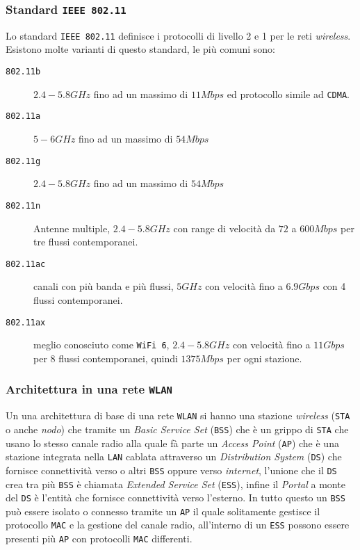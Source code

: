         \subsubsection{Standard \texttt{IEEE 802.11}}
            Lo standard \texttt{IEEE 802.11} definisce i protocolli di livello 2 e 1 per le reti \textit{wireless}. Esistono molte varianti di questo standard, le più comuni sono:
            \begin{description}
                \item[\texttt{802.11b}] $2.4-5.8GHz$ fino ad un massimo di $11Mbps$ ed protocollo simile ad \texttt{CDMA}.
                \item[\texttt{802.11a}] $5-6GHz$ fino ad un massimo di $54Mbps$
                \item[\texttt{802.11g}] $2.4-5.8GHz$ fino ad un massimo di $54Mbps$
                \item[\texttt{802.11n}] Antenne multiple, $2.4-5.8GHz$ con range di velocità da $72$ a $600Mbps$ per tre flussi contemporanei.
                \item[\texttt{802.11ac}] canali con più banda e più flussi, $5GHz$ con velocità fino a $6.9Gbps$ con 4 flussi contemporanei.
                \item[\texttt{802.11ax}] meglio conosciuto come \texttt{WiFi 6}, $2.4-5.8GHz$ con velocità fino a $11Gbps$ per 8 flussi contemporanei, quindi $1375Mbps$ per ogni stazione.
            \end{description}
        \subsubsection{Architettura in una rete \texttt{WLAN}}
            Un una architettura di base di una rete \texttt{WLAN} si hanno una stazione \textit{wireless} (\texttt{STA} o anche \textit{nodo}) che tramite un \textit{Basic Service Set} (\texttt{BSS}) che è un grippo di \texttt{STA} che usano lo stesso canale radio alla quale fà parte un \textit{Access Point} (\texttt{AP}) che è una stazione integrata nella \texttt{LAN} cablata attraverso un \textit{Distribution System} (\texttt{DS}) che fornisce connettività verso o altri \texttt{BSS} oppure verso \textit{internet}, l'unione che il \texttt{DS} crea tra più \texttt{BSS} è chiamata \textit{Extended Service Set} (\texttt{ESS}), infine il \textit{Portal} a monte del \texttt{DS} è l'entità che fornisce connettività verso l'esterno.\newline
            In tutto questo un \texttt{BSS} può essere isolato o connesso tramite un \texttt{AP} il quale solitamente gestisce il protocollo \texttt{MAC} e la gestione del canale radio, all'interno di un \texttt{ESS} possono essere presenti più \texttt{AP} con protocolli \texttt{MAC} differenti.
